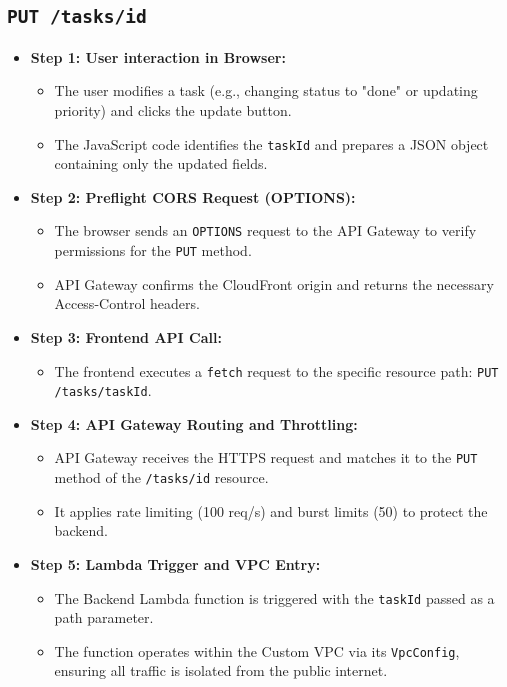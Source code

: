 \subsection{\texttt{PUT /tasks/{id}}}
\begin{itemize}
  \item \textbf{Step 1: User interaction in Browser:}
  \begin{itemize}
    \item The user modifies a task (e.g., changing status to "done" or updating priority) and clicks the update button.
    \item The JavaScript code identifies the \texttt{taskId} and prepares a JSON object containing only the updated fields.
  \end{itemize}
  \item \textbf{Step 2: Preflight CORS Request (OPTIONS):}
  \begin{itemize}
    \item The browser sends an \texttt{OPTIONS} request to the API Gateway to verify permissions for the \texttt{PUT} method.
    \item API Gateway confirms the CloudFront origin and returns the necessary Access-Control headers.
  \end{itemize}
  \item \textbf{Step 3: Frontend API Call:}
  \begin{itemize}
    \item The frontend executes a \texttt{fetch} request to the specific resource path: \texttt{PUT /tasks/{taskId}}.
  \end{itemize}
  \item \textbf{Step 4: API Gateway Routing and Throttling:}
  \begin{itemize}
    \item API Gateway receives the HTTPS request and matches it to the \texttt{PUT} method of the \texttt{/tasks/{id}} resource.
    \item It applies rate limiting (100 req/s) and burst limits (50) to protect the backend.
  \end{itemize}
  \item \textbf{Step 5: Lambda Trigger and VPC Entry:}
  \begin{itemize}
    \item The Backend Lambda function is triggered with the \texttt{taskId} passed as a path parameter.
    \item The function operates within the Custom VPC via its \texttt{VpcConfig}, ensuring all traffic is isolated from the public internet.

\end{itemize}
\end{itemize}

